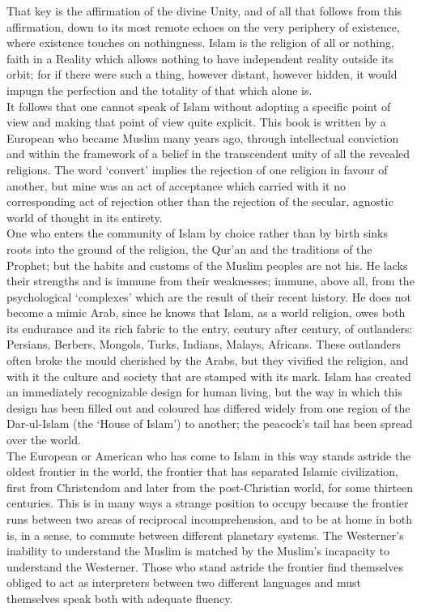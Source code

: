 \documentclass[10pt, twoside,openright]{book}
\begin{document}
That key is the affirmation of the divine Unity, and of all that follows from this affirmation, down to its most remote echoes on the very periphery of existence, where existence touches on nothingness. Islam is the religion of all or nothing, faith in a Reality which allows nothing to have independent reality outside its orbit; for if there were such a thing, however distant, however hidden, it would impugn the perfection and the totality of that which alone is.\\

It follows that one cannot speak of Islam without adopting a specific point of view and making that point of view quite explicit. This book is written by a European who became Muslim many years ago, through intellectual conviction and within the framework of a belief in the transcendent unity of all the revealed religions. The word `convert' implies the rejection of one religion in favour of another, but mine was an act of acceptance which carried with it no corresponding act of rejection other than the rejection of the secular, agnostic world of thought in its entirety. \\

One who enters the community of Islam by choice rather than by birth sinks roots into the ground of the religion, the Qur'an and the traditions of the Prophet; but the habits and customs of the Muslim peoples are not his. He lacks their strengths and is immune from their weaknesses; immune, above all, from the psychological `complexes' which are the result of their recent history. He does not become a mimic Arab, since he knows that Islam, as a world religion, owes both its endurance and its rich fabric to the entry, century after century, of outlanders: Persians, Berbers, Mongols, Turks, Indians, Malays, Africans. These outlanders often broke the mould cherished by the Arabs, but they vivified the religion, and with it the culture and society that are stamped with its mark. Islam has created an immediately recognizable design for human living, but the way in which this design has been filled out and coloured has differed widely from one region of the Dar\hyp{}ul\hyp{}Islam (the `House of Islam') to another; the peacock's tail has been spread over the world. \\

The European or American who has come to Islam in this way stands astride the oldest frontier in the world, the frontier that has separated Islamic civilization, first from Christendom and later from the post\hyp{}Christian world, for some thirteen centuries. This is in many ways a strange position to occupy because the frontier runs between two areas of reciprocal incomprehension, and to be at home in both is, in a sense, to commute between different planetary systems. The Westerner's inability to understand the Muslim is matched by the Muslim's incapacity to understand the Westerner. Those who stand astride the frontier find themselves obliged to act as interpreters between two different languages and must themselves speak both with adequate fluency. \\
\end{document}
